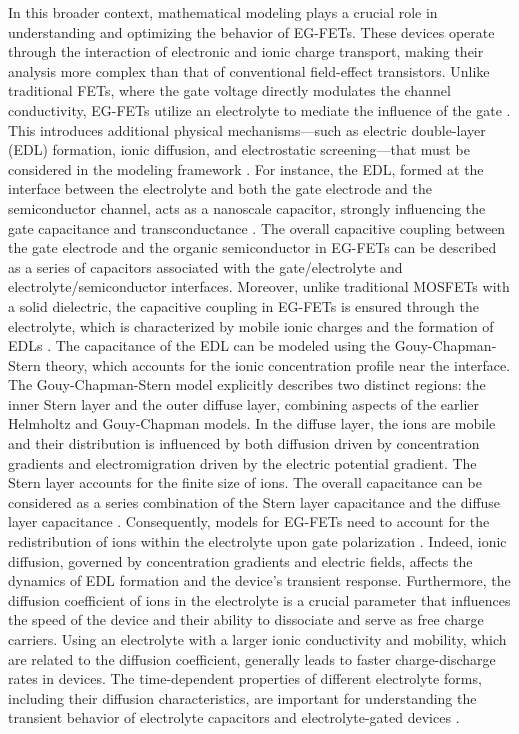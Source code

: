 In this broader context, mathematical modeling plays a crucial role in understanding and optimizing the behavior of EG-FETs. These devices operate through the interaction of electronic and ionic charge transport, making their analysis more complex than that of conventional field-effect transistors. Unlike traditional FETs, where the gate voltage directly modulates the channel conductivity, EG-FETs utilize an electrolyte to mediate the influence of the gate \citep{delavariNernst2021,chennitInkjetPrinted2023}. This introduces additional physical mechanisms—such as electric double-layer (EDL) formation, ionic diffusion, and electrostatic screening—that must be considered in the modeling framework \citep{delavariNernst2021,chennitInkjetPrinted2023}. For instance, the EDL, formed at the interface between the electrolyte and both the gate electrode and the semiconductor channel, acts as a nanoscale capacitor, strongly influencing the gate capacitance and transconductance \citep{masseyModeling2021}. The overall capacitive coupling between the gate electrode and the organic semiconductor in EG-FETs can be described as a series of capacitors associated with the gate/electrolyte and electrolyte/semiconductor interfaces. Moreover, unlike traditional MOSFETs with a solid dielectric, the capacitive coupling in EG-FETs is ensured through the electrolyte, which is characterized by mobile ionic charges and the formation of EDLs \citep{delavariNernst2021,piccaUltimately2020}. 
The capacitance of the EDL can be modeled using the Gouy-Chapman-Stern theory, which accounts for the ionic concentration profile near the interface. The Gouy-Chapman-Stern model explicitly describes two distinct regions: the inner Stern layer and the outer diffuse layer, combining aspects of the earlier Helmholtz and Gouy-Chapman models. In the diffuse layer, the ions are mobile and their distribution is influenced by both diffusion driven by concentration gradients and electromigration driven by the electric potential gradient. The Stern layer accounts for the finite size of ions. The overall capacitance can be considered as a series combination of the Stern layer capacitance and the diffuse layer capacitance \citep{pilonRecent2015}.
Consequently, models for EG-FETs need to account for the redistribution of ions within the electrolyte upon gate polarization \citep{delavariNernst2021,pilonRecent2015}. Indeed, ionic diffusion, governed by concentration gradients and electric fields, affects the dynamics of EDL formation and the device's transient response. Furthermore, the diffusion coefficient of ions in the electrolyte is a crucial parameter that influences the speed of the device and their ability to dissociate and serve as free charge carriers. Using an electrolyte with a larger ionic conductivity and mobility, which are related to the diffusion coefficient, generally leads to faster charge-discharge rates in devices. The time-dependent properties of different electrolyte forms, including their diffusion characteristics, are important for understanding the transient behavior of electrolyte capacitors and electrolyte-gated devices \citep{masseyModeling2021}.
